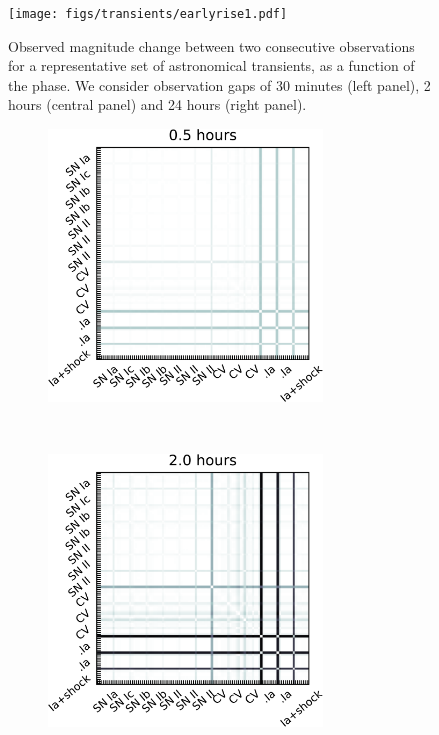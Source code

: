 \begin{figure}[hbt]
\centerline{
\texttt{[image: figs/transients/earlyrise1.pdf]}
}
\caption{Observed magnitude change between two consecutive observations for a representative set of astronomical transients, as a function of the phase. We consider observation gaps of 30 minutes  (left panel), 2 hours (central panel) and 24 hours (right panel).
}
\label{fig:earlyrise}
\end{figure}
\begin{figure}[hbt]
\centering
    \begin{subfigure}[t]{0.45\textwidth}
        \centering
        \includegraphics[width=0.8\textwidth]{figs/transients/TransientsAgeSimilarity1.pdf}
    \end{subfigure}%
    ~ 
    \begin{subfigure}[t]{0.45\textwidth}
        \centering
        \includegraphics[width=0.8\textwidth]{figs/transients/TransientsAgeSimilarity2.pdf}
    \end{subfigure}



\end{figure}
